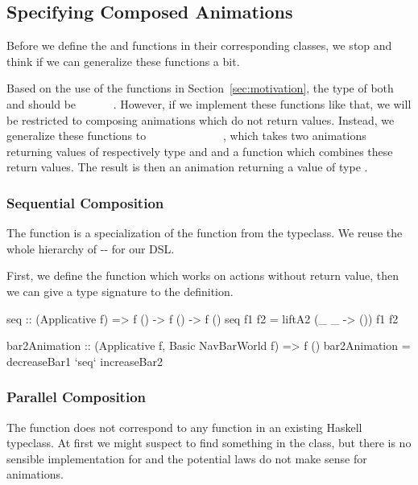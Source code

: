 \subsection{Specifying Composed Animations}

Before we define the  and  functions in their corresponding classes, we stop and think if we can generalize these functions a bit.

Based on the use of the functions in Section~\ref{sec:motivation}, the type of both  and  should be ~\hs{()}~\hs{->}~~\hs{->}~~\hs{()}. However, if we implement these functions like that, we will be restricted to composing animations which do not return values. Instead, we generalize these functions to \hs{(}~\hs{->}~~\hs{->}~\hs{)}~\hs{->}~~~\hs{->}~~~\hs{->}~~, which takes two animations returning values of respectively type  and  and a function which combines these return values. The result is then an animation returning a value of type .

\subsubsection{Sequential Composition}

The  function is a specialization of the  function from the  typeclass. We reuse the whole hierarchy of -- for our DSL.

First, we define the  function which works on actions without return value, then we can give a type signature to the  definition.

\begin{code}
seq :: (Applicative f) => f () -> f () -> f ()
seq f1 f2 = liftA2 (\_ _ -> ()) f1 f2

bar2Animation :: (Applicative f, Basic NavBarWorld f) => f ()
bar2Animation = decreaseBar1 `seq` increaseBar2
\end{code}

\subsubsection{Parallel Composition}

The  function does not correspond to any function in an existing Haskell typeclass. At first we might suspect to find something in the  class, but there is no sensible implementation for  and the potential laws do not make sense for animations.

